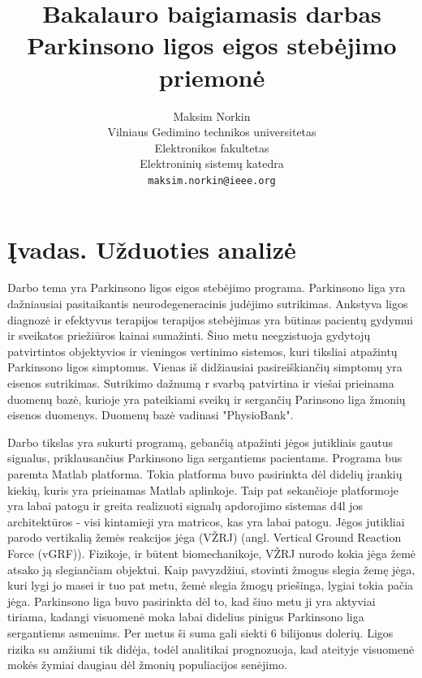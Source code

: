 \documentclass[10pt,onecolumn,draftcls]{IEEEtran}
\author{Maksim Norkin\\Vilniaus Gedimino technikos
  universitetas\\Elektronikos fakultetas\\Elektroninių sistemų katedra\\\texttt{maksim.norkin@ieee.org}}
\title{Bakalauro baigiamasis darbas\\Parkinsono ligos eigos stebėjimo priemonė}
\begin{document}
\maketitle

\section{Įvadas. Užduoties analizė}

Darbo tema yra Parkinsono ligos eigos stebėjimo programa. Parkinsono
liga yra dažniausiai pasitaikantis neurodegeneracinis judėjimo
sutrikimas. Ankstyva ligos diagnozė ir efektyvus terapijos terapijos
stebėjimas yra būtinas pacientų gydymui ir sveikatos priežiūros kainai
sumažinti. Šiuo metu neegzistuoja gydytojų patvirtintos objektyvios ir
vieningos vertinimo sistemos, kuri tiksliai atpažintų Parkinsono ligos
simptomus. Vienas iš didžiausiai pasireiškiančių simptomų yra eisenos
sutrikimas. Sutrikimo dažnumą r svarbą patvirtina ir viešai prieinama
duomenų bazė, kurioje yra pateikiami sveikų ir sergančių Parinsono
liga žmonių eisenos duomenys. Duomenų bazė vadinasi "PhysioBank".

Darbo tikslas yra sukurti programą, gebančią atpažinti jėgos
jutikliais gautus signalus, priklausančius Parkinsono liga sergantiems
pacientams. Programa bus paremta Matlab platforma. Tokia platforma
buvo pasirinkta dėl didelių įrankių kiekių, kuris yra prieinamas
Matlab aplinkoje. Taip pat sekančioje platformoje yra labai patogu ir
greita realizuoti signalų apdorojimo sistemas d4l jos architektūros -
visi kintamieji yra matricos, kas yra labai patogu. Jėgos jutikliai
parodo vertikalią žemės reakcijos jėga (VŽRJ) (angl. Vertical Ground
Reaction Force (vGRF)). Fizikoje, ir būtent biomechanikoje, VŽRJ
nurodo kokia jėga žemė atsako ją slegiančiam objektui. Kaip
pavyzdžiui, stovinti žmogus slegia žemę jėga, kuri lygi jo masei ir
tuo pat metu, žemė slegia žmogų priešinga, lygiai tokia pačia
jėga. Parkinsono liga buvo pasirinkta dėl to, kad šiuo metu ji yra
aktyviai tiriama, kadangi visuomenė moka labai didelius pinigus
Parkinsono liga sergantiems asmenims. Per metus ši suma gali siekti 6
bilijonus dolerių. Ligos rizika su amžiumi tik didėja, todėl
analitikai prognozuoja, kad ateityje visuomenė mokės žymiai daugiau
dėl žmonių populiacijos senėjimo.
\end{document}
